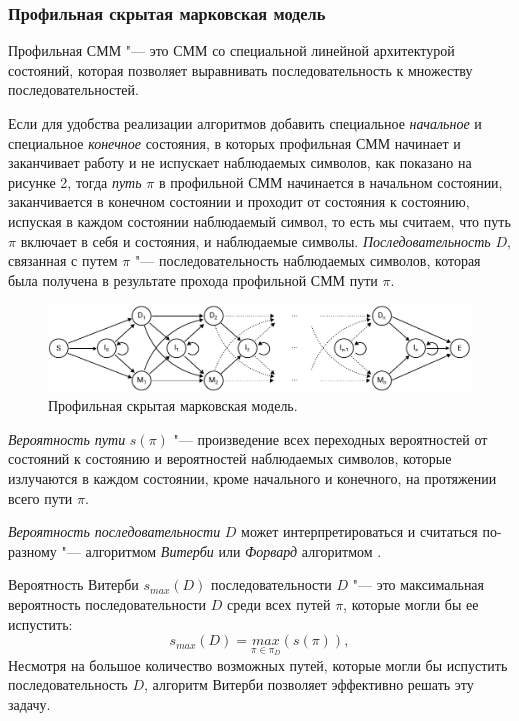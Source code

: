 \documentclass[specialist,
substylefile = spbu_report.rtx,
subf,href,colorlinks=true, 12pt]{disser}
\begin{document}
			\subsubsection{Профильная скрытая марковская модель}
			Профильная СММ "--- это СММ со специальной линейной архитектурой состояний, которая позволяет выравнивать последовательность к множеству последовательностей.						
									
			Если для удобства реализации алгоритмов добавить специальное \textit{начальное} и специальное \textit{конечное} состояния, в которых профильная СММ начинает и заканчивает работу и не испускает наблюдаемых символов, как показано на рисунке 2, тогда \textit{путь} $\pi$ в профильной СММ начинается в начальном состоянии, заканчивается в конечном состоянии и проходит от состояния к состоянию, испуская в каждом состоянии наблюдаемый символ, то есть мы считаем, что путь $\pi$ включает в себя и состояния, и наблюдаемые символы. \textit{Последовательность} $D$, связанная с путем $\pi$ "--- последовательность наблюдаемых символов, которая была получена в результате прохода профильной СММ пути $\pi$. 
			
			\begin{figure}[h]
				\includegraphics[width=15cm]{figure2}
				\centering
				\caption{Профильная скрытая марковская модель.}
			\end{figure}
			
			\textit{Вероятность пути} $s(\pi)$ "--- произведение всех переходных вероятностей от состояний к состоянию и вероятностей наблюдаемых символов, которые излучаются в каждом состоянии, кроме начального и конечного, на протяжении всего пути $\pi$. 
			
			\textit{Вероятность последовательности} $D$ может интерпретироваться и считаться по-разному "--- алгоритмом \textit{Витерби} или \textit{Форвард} алгоритмом \cite{Dugad1996, Compeau2015a}.
			
			Вероятность Витерби $s_{max}(D)$ последовательности $D$ "--- это максимальная вероятность последовательности $D$ среди всех путей $\pi$, которые могли бы ее испустить:
			\begin{equation}
				s_{max}(D) = \underset{\pi \in \pi_{D}}{max}(s(\pi)),
			\end{equation}
			Несмотря на большое количество возможных путей, которые могли бы испустить последовательность $D$, алгоритм Витерби позволяет эффективно решать эту задачу.
			
\end{document}
